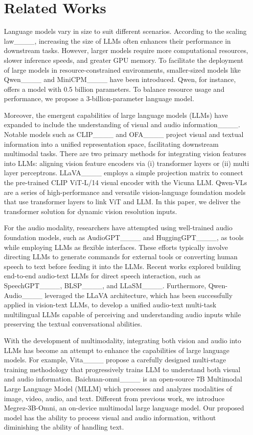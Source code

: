 \section{Related Works}
Language models vary in size to suit different scenarios. According to the scaling law____, increasing the size of LLMs often enhances their performance in downstream tasks. However, larger models require more computational resources, slower inference speeds, and greater GPU memory. To facilitate the deployment of large models in resource-constrained environments, smaller-sized models like Qwen____ and MiniCPM____ have been introduced. Qwen, for instance, offers a model with 0.5 billion parameters. To balance resource usage and performance, we propose a 3-billion-parameter language model. 


Moreover, the emergent capabilities of large language models (LLMs) have expanded to include the understanding of visual and audio information____. Notable models such as CLIP____ and OFA____ project visual and textual information into a unified representation space, facilitating downstream multimodal tasks. 
There are two primary methods for integrating vision features into LLMs: aligning vision feature encoders via (i) transformer layers or (ii) multi layer perceptrons. LLaVA____ employs a simple projection matrix to connect the pre-trained CLIP ViT-L/14 visual encoder with the Vicuna LLM. Qwen-VLs are a series of high-performance and versatile vision-language foundation models that use transformer layers to link ViT and LLM. In this paper, we deliver the transformer solution for dynamic vision resolution inputs.

For the audio modality, researchers have attempted using well-trained audio foundation models, such as AudioGPT____ and HuggingGPT____, as tools while employing LLMs as flexible interfaces. These efforts typically involve directing LLMs to generate commands for external tools or converting human speech to text before feeding it into the LLMs. Recent works explored building end-to-end audio-text LLMs for direct speech interaction, such as SpeechGPT____, BLSP____, and LLaSM____. Furthermore, Qwen-Audio____ leveraged the LLaVA architecture, which has been successfully applied in vision-text LLMs, to develop a unified audio-text multi-task multilingual LLMs capable of perceiving and understanding audio inputs while preserving the textual conversational abilities.  

With the development of multimodality, integrating both vision and audio into LLMs has become an attempt to enhance the capabilities of large language models. For example, Vita____ propose a carefully designed multi-stage training methodology that progressively trains LLM to understand both visual and audio information. Baichuan-omni____ is an open-source 7B Multimodal Large Language Model (MLLM) which processes and analyzes modalities of image, video, audio, and text. Different from previous work, we introduce Megrez-3B-Omni, an on-device multimodal large language model. Our proposed model has the ability to process visual and audio information, without diminishing the ability of handling text.